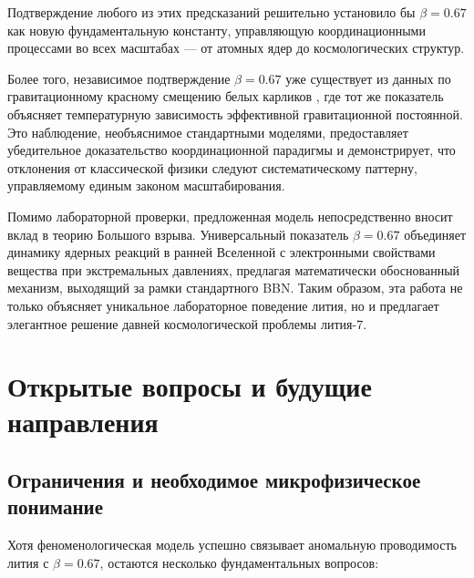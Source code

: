 \documentclass[12pt,a4paper]{article}
\theoremstyle{remark}
\begin{document}
	Подтверждение любого из этих предсказаний решительно установило бы \(\beta = 0.67\) как новую фундаментальную константу, управляющую координационными процессами во всех масштабах — от атомных ядер до космологических структур.
	
	Более того, независимое подтверждение \(\beta = 0.67\) уже существует из данных по гравитационному красному смещению белых карликов \cite{Crumpler2024}, где тот же показатель объясняет температурную зависимость эффективной гравитационной постоянной. Это наблюдение, необъяснимое стандартными моделями, предоставляет убедительное доказательство координационной парадигмы и демонстрирует, что отклонения от классической физики следуют систематическому паттерну, управляемому единым законом масштабирования.
	
	Помимо лабораторной проверки, предложенная модель непосредственно вносит вклад в теорию Большого взрыва. Универсальный показатель \(\beta = 0.67\) объединяет динамику ядерных реакций в ранней Вселенной с электронными свойствами вещества при экстремальных давлениях, предлагая математически обоснованный механизм, выходящий за рамки стандартного BBN. Таким образом, эта работа не только объясняет уникальное лабораторное поведение лития, но и предлагает элегантное решение давней космологической проблемы лития-7.
	
	\section{Открытые вопросы и будущие направления}
	\label{sec:open-questions}
	
	\subsection{Ограничения и необходимое микрофизическое понимание}
	
	Хотя феноменологическая модель успешно связывает аномальную проводимость лития с \(\beta = 0.67\), остаются несколько фундаментальных вопросов:
	
\end{document}
